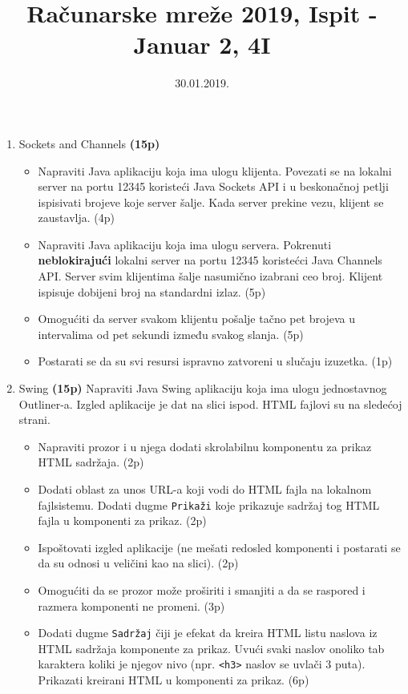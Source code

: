\documentclass[]{article}
\title{Ra\v{c}unarske mre\v{z}e 2019, Ispit - Januar 2, 4I}
\author{}
\date{30.01.2019.}
\begin{document}
\maketitle

\begin{enumerate}
  \item Sockets and Channels \textbf{(15p)}
  \begin{itemize}
    \item Napraviti Java aplikaciju koja ima ulogu klijenta. Povezati se na lokalni server na portu 12345 koriste\'c{}i Java Sockets API i u beskona\v{c}noj petlji ispisivati brojeve koje server \v{s}alje. Kada server prekine vezu, klijent se zaustavlja. \hfill (4p)
    \item Napraviti Java aplikaciju koja ima ulogu servera. Pokrenuti \textbf{neblokiraju\'c{}i} lokalni server na portu 12345 koriste\'c{}ci Java Channels API. Server svim klijentima \v{s}alje nasumi\v{c}no izabrani ceo broj. Klijent ispisuje dobijeni broj na standardni izlaz. \hfill (5p)
    \item Omogu\'c{}iti da server svakom klijentu po\v{s}alje ta\v{c}no pet brojeva u intervalima od pet sekundi između svakog slanja. \hfill (5p)
    \item Postarati se da su svi resursi ispravno zatvoreni u slu\v{c}aju izuzetka. \hfill (1p)
  \end{itemize}

  \item Swing \textbf{(15p)}
  Napraviti Java Swing aplikaciju koja ima ulogu jednostavnog Outliner-a. Izgled aplikacije je dat na slici ispod. HTML fajlovi su na slede\'c{}oj strani.
  \begin{itemize}
    \item Napraviti prozor i u njega dodati skrolabilnu komponentu za prikaz HTML sadr\v{z}aja. \hfill (2p)
    \item Dodati oblast za unos URL-a koji vodi do HTML fajla na lokalnom fajlsistemu. Dodati dugme \texttt{Prika\v{z}i} koje prikazuje sadr\v{z}aj tog HTML fajla u komponenti za prikaz. \hfill (2p)
    \item Ispo\v{s}tovati izgled aplikacije (ne me\v{s}ati redosled komponenti i postarati se da su odnosi u veli\v{c}ini kao na slici). \hfill (2p)
    \item Omogu\'c{}iti da se prozor mo\v{z}e pro\v{s}iriti i smanjiti a da se raspored i razmera komponenti ne promeni. \hfill (3p)
    \item Dodati dugme \texttt{Sadr\v{z}aj} \v{c}iji je efekat da kreira HTML listu naslova iz HTML sadr\v{z}aja komponente za prikaz. Uvu\'c{}i svaki naslov onoliko tab karaktera koliki je njegov nivo (npr. \texttt{<h3>} naslov se uvla\v{c}i 3 puta). Prikazati kreirani HTML u komponenti za prikaz. \hfill (6p)
  \end{itemize}


\end{enumerate}
\end{document}
